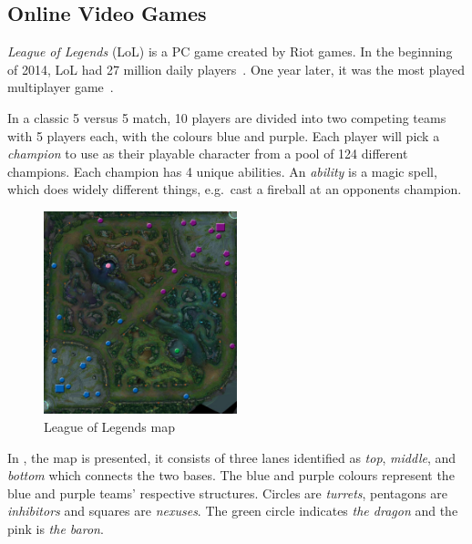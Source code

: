 \subsection{Online Video Games}\label{sec:onlinevideogames}
\emph{League of Legends} (LoL) is a PC game created by Riot games. In the beginning of 2014, LoL had 27 million daily players~\cite{LoL27mill}. One year later, it was the most played multiplayer game~\cite{LoLmostplayed}.

In a classic 5 versus 5 match, 10 players are divided into two competing teams with 5 players each, with the colours blue and purple. Each player will pick a \emph{champion} to use as their playable character from a pool of 124 different champions. Each champion has 4 unique abilities. An \emph{ability} is a magic spell, which does widely different things, e.g.\ cast a fireball at an opponents champion.

\begin{figure}[!htb]
  \centering
    \includegraphics[width=0.5\textwidth]{img/lolmap.jpg}
  \caption{League of Legends map~\cite{lolmap}}\label{fig:lolmap}
\end{figure}

In , the map is presented, it consists of three lanes identified as \emph{top}, \emph{middle}, and \emph{bottom} which connects the two bases. The blue and purple colours represent the blue and purple teams' respective structures. Circles are \emph{turrets}, pentagons are \emph{inhibitors} and squares are \emph{nexuses}. The green circle indicates \emph{the dragon} and the pink is \emph{the baron}.

